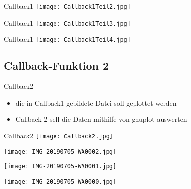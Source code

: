 \documentclass{beamer}
\begin{document}
\begin{frame}{Callback1}
\texttt{[image: Callback1Teil2.jpg]} 
\end{frame}

\begin{frame}{Callback1}
\texttt{[image: Callback1Teil3.jpg]} 
\end{frame}

\begin{frame}{Callback1}
\texttt{[image: Callback1Teil4.jpg]} 
\end{frame}

\subsection{Callback-Funktion 2}
\begin{frame}{Callback2}
\begin{itemize}
\item die in Callback1 gebildete Datei soll geplottet werden
\item Callback 2 soll die Daten mithilfe von gnuplot auswerten
\end{itemize}
\end{frame}

\begin{frame}{Callback2}
\texttt{[image: Callback2.jpg]} 
\end{frame}

\begin{frame}
\texttt{[image: IMG-20190705-WA0002.jpg]} 
\end{frame}

\begin{frame}
\texttt{[image: IMG-20190705-WA0001.jpg]} 
\end{frame}

\begin{frame}
\texttt{[image: IMG-20190705-WA0000.jpg]} 
\end{frame}
\end{document}
